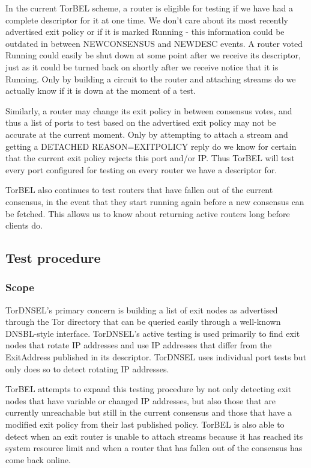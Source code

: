 \documentclass{article}
\begin{document}
In the current TorBEL scheme, a router is eligible for testing if we
have had a complete descriptor for it at one time.  We don't care
about its most recently advertised exit policy or if it is marked
Running - this information could be outdated in between NEWCONSENSUS
and NEWDESC events.  A router voted Running could easily be shut down
at some point after we receive its descriptor, just as it could be
turned back on shortly after we receive notice that it is Running.
Only by building a circuit to the router and attaching streams do we
actually know if it is down at the moment of a test.

Similarly, a router may change its exit policy in between consensus
votes, and thus a list of ports to test based on the advertised exit
policy may not be accurate at the current moment.  Only by attempting
to attach a stream and getting a DETACHED REASON=EXITPOLICY reply do
we know for certain that the current exit policy rejects this port
and/or IP.  Thus TorBEL will test every port configured for testing on
every router we have a descriptor for.

TorBEL also continues to test routers that have fallen out of the
current consensus, in the event that they start running again
before a new consensus can be fetched.  This allows us to know about
returning active routers long before clients do.

\subsection{Test procedure}
\subsubsection{Scope}
TorDNSEL's primary concern is building a list of exit nodes as
advertised through the Tor directory that can be queried easily
through a well-known DNSBL-style interface.  TorDNSEL's active testing
is used primarily to find exit nodes that rotate IP addresses and use
IP addresses that differ from the ExitAddress published in its
descriptor.  TorDNSEL uses individual port tests but only does so to
detect rotating IP addresses.

TorBEL attempts to expand this testing procedure by not only detecting
exit nodes that have variable or changed IP addresses, but also those
that are currently unreachable but still in the current consensus and
those that have a modified exit policy from their last published
policy.  TorBEL is also able to detect when an exit router is unable
to attach streams because it has reached its system resource limit and
when a router that has fallen out of the consensus has come back
online.
\end{document}
